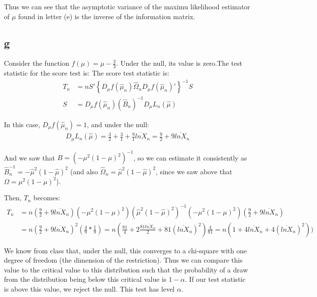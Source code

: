 \documentclass[12pt]{paper}
\begin{document}
Thus we can see that the asymptotic variance of the maximu likelihood estimator of $\mu$ found in letter (e) is the inverse of the information matrix.

\subsection*{g}

Consider the function $f(\mu)=\mu-\frac{2}{3}$. Under the null, its value is zero.The test statistic for the score test is:
The score test statistic is:
\begin{align*}
T_n&=nS'\left\{D_{\mu}f(\hat{\mu}_n)\hat{\Omega}_n D_{\mu}f(\hat{\mu}_n)'\right\}^{-1}S\\
S&=D_{\mu}f(\hat{\mu}_n)(\hat{B}_n)^{-1}D_{\mu} L_n(\hat{\mu})
\end{align*}

In this case, $D_{\mu}f(\hat{\mu}_n)=1$, and under the null:
\begin{align*}
D_{\mu} L_n(\hat{\mu})=\frac{3}{2}+\frac{3}{1}+\frac{9}{1}\overline{lnX}_n=\frac{9}{2}+9\overline{lnX}_n
\end{align*}

And we saw that $B=(-\mu^2(1-\mu)^2)^{-1}$, so we can estimate it consistently as $\hat{B}_n^{-1}=-\hat{\mu}^2(1-\hat{\mu})^2$ (and also $\hat{\Omega}_n=\hat{\mu}^2(1-\hat{\mu})^2$, since we saw above that $\Omega=\mu^2(1-\mu)^2$).

Then, $T_n$ becomes:
\begin{align*}
T_n&=n(\frac{9}{2}+9\overline{lnX}_n)(-\mu^2(1-\mu)^2)(\hat{\mu}^2(1-\hat{\mu})^2)^{-1}(-\mu^2(1-\mu)^2)(\frac{9}{2}+9\overline{lnX}_n)\\
&=n(\frac{9}{2}+9\overline{lnX}_n)^2(\frac{4}{9}*\frac{1}{9})=n(\frac{81}{4}+2\frac{81\overline{lnX}_n}{2}+81(\overline{lnX}_n)^2)\frac{4}{81}=n(1+4\overline{lnX}_n+4(\overline{lnX}_n)^2))
\end{align*}

We know from class that, under the null, this converges to a chi-square with one degree of freedom (the dimension of the restriction). Thus we can compare this value to the critical value to this distribution such that the probability of a draw from the distribution being below this critical value is $1-\alpha$. If our test statistic is above this value, we reject the null. This test has level $\alpha$.
\end{document}

